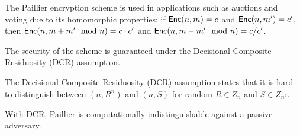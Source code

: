 \documentclass[10pt]{article}
\begin{document}
The Paillier encryption scheme is used in applications such as auctions and voting due to its homomorphic properties: if $\mathsf{Enc}(n, m) = c$ and $\mathsf{Enc}(n, m') = c'$, then $\mathsf{Enc}(n, m+m' \mod n) = c \cdot c'$ and $\mathsf{Enc}(n, m-m' \mod n) = c / c'$.

The security of the scheme is guaranteed under the Decisional Composite Residuosity (DCR) assumption. 
\begin{definition}
	The Decisional Composite Residuosity (DCR) assumption states that it is hard to distinguish between $(n, R^n)$ and $(n, S)$ for random $R \in Z_n$ and $S \in Z_{n^2}$.
\end{definition}
\noindent With DCR, Paillier is computationally indistinguishable against a passive adversary.

\nocite{*}


\end{document}
